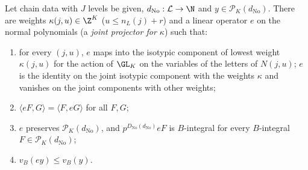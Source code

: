 \begin{lemma}\label{pf:linkG:jointproj}
Let chain data with $J$ levels be given, $d_{\mathrm{No}}:\mathcal L\to\N$ and $y\in\mathcal P_K(d_{\mathrm{No}})$. There are weights $\kappa(j,u)\in
\Z^K$ ($u\le n_L(j)+r$) and a linear operator $e$ on the normal polynomials (a \emph{joint projector for $\kappa$}) such that:
\begin{enumerate}[label=(\alph*)]
\item for every $(j,u)$, $e$ maps into the isotypic component of lowest weight $\kappa(j,u)$ for the action of $\GL_K$ on the
variables of the letters of $N(j,u)$; $e$ is the identity on the joint isotypic component with the weights $\kappa$ and vanishes
on the joint components with other weights;
\item $\langle eF,G\rangle=\langle F,eG\rangle$ for all $F,G$;
\item $e$ preserves $\mathcal P_K(d_{\mathrm{No}})$, and $p^{D_{\mathrm{No}}(d_{\mathrm{No}})}eF$ is $B$-integral for every $B$-integral
$F\in\mathcal P_K(d_{\mathrm{No}})$;
\item $v_B(ey)\le v_B(y)$.
\end{enumerate}
\end{lemma}

